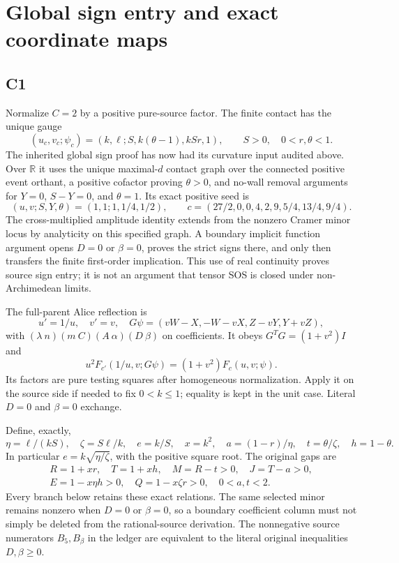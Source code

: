 \documentclass[11pt]{article}
\newcommand{\R}{\mathbb R}
\begin{document}
\section{Global sign entry and exact coordinate maps}

\subsection{C1}

Normalize $C=2$ by a positive pure-source factor. The finite contact has
the unique gauge
\[
(u_c,v_c;\psi_c)=(k,\ell;S,k(\theta-1),kSr,1),
\qquad S>0,\quad0<r,\theta<1.
\]
The inherited global sign proof has now had its curvature input audited
above. Over $\R$ it uses the unique maximal-$d$ contact graph over the
connected positive event orthant, a positive cofactor proving
$\theta>0$, and no-wall removal arguments for $Y=0$, $S-Y=0$, and
$\theta=1$. Its exact positive seed is
\[
(u,v;S,Y,\theta)=(1,1;1,1/4,1/2),\qquad
c=(27/2,0,0,4,2,9,5/4,13/4,9/4).
\]
The cross-multiplied amplitude identity extends from the nonzero Cramer
minor locus by analyticity on this specified graph. A boundary implicit
function argument opens $D=0$ or $\beta=0$, proves the strict signs
there, and only then transfers the finite first-order implication.
This use of real continuity proves source sign entry; it is not an
argument that tensor SOS is closed under non-Archimedean limits.

The full-parent Alice reflection is
\[
u'=1/u,\quad v'=v,\quad
G\psi=(vW-X,-W-vX,Z-vY,Y+vZ),
\]
with $(\lambda\ n)(m\ C)(A\ \alpha)(D\ \beta)$ on coefficients.
It obeys $G^TG=(1+v^2)I$ and
\[
u^2F_{c'}(1/u,v;G\psi)=(1+v^2)F_c(u,v;\psi).
\]
Its factors are pure testing squares after homogeneous normalization.
Apply it on the source side if needed to fix $0<k\le1$; equality is
kept in the unit case. Literal $D=0$ and $\beta=0$ exchange.

Define, exactly,
\[
\eta=\ell/(kS),\quad\zeta=S\ell/k,\quad e=k/S,
\quad x=k^2,\quad a=(1-r)/\eta,\quad t=\theta/\zeta,
\quad h=1-\theta.
\]
In particular $e=k\sqrt{\eta/\zeta}$, with the positive square root.
The original gaps are
\begin{gather*}
R=1+xr,\quad T=1+xh,\quad M=R-t>0,\quad J=T-a>0,\\
E=1-x\eta h>0,\quad Q=1-x\zeta r>0,\quad0<a,t<2.
\end{gather*}
Every branch below retains these exact relations. The same selected
minor remains nonzero when $D=0$ or $\beta=0$, so a boundary coefficient
column must not simply be deleted from the rational-source derivation.
The nonnegative source numerators $B_5,B_\beta$ in the ledger are
equivalent to the literal original inequalities $D,\beta\ge0$.
\end{document}

